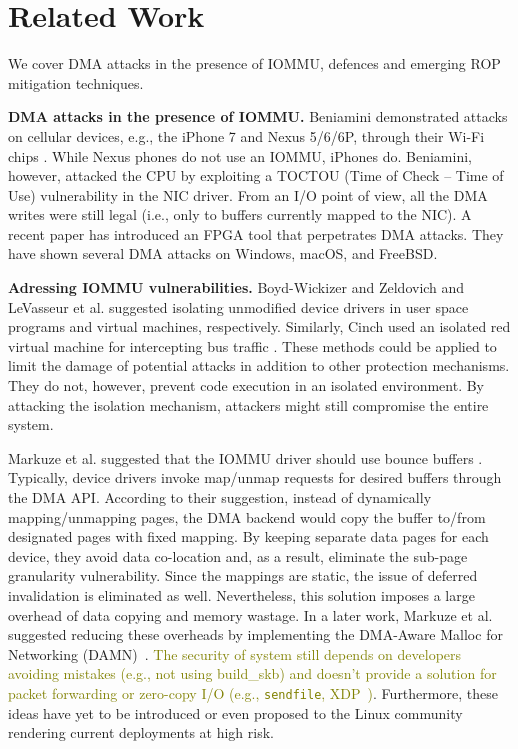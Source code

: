 \section{Related Work}
We cover DMA attacks in the presence of IOMMU, defences and emerging ROP mitigation techniques.

\smallskip
\noindent\textbf{DMA attacks in the presence of IOMMU.}
Beniamini demonstrated attacks on cellular devices, e.g., the iPhone 7 and Nexus 5/6/6P, through their Wi-Fi chips \cite{Ben17a, Ben17b}. While Nexus phones do not use an IOMMU, iPhones do. Beniamini, however, attacked the CPU by exploiting a TOCTOU (Time of Check – Time of Use) vulnerability in the NIC driver. From an I/O point of view, all the DMA writes were still legal (i.e., only to buffers currently mapped to the NIC). A recent paper \cite{thunder} has introduced an FPGA tool that perpetrates DMA attacks. They have shown several \simple DMA attacks on Windows, macOS, and FreeBSD.

\smallskip
\noindent\textbf{Adressing IOMMU vulnerabilities.}
Boyd-Wickizer and Zeldovich \cite{BWZ10} and LeVasseur et al. \cite{LUSG04} suggested isolating unmodified device drivers in user space programs and virtual machines, respectively. Similarly, Cinch used an isolated red virtual machine for intercepting bus traffic \cite{AWH16}. These methods could be applied to limit the damage of potential attacks in addition to other protection mechanisms. They do not, however, prevent code execution in an isolated environment. By attacking the isolation mechanism, attackers might still compromise the entire system.

Markuze et al. suggested that the IOMMU driver should use bounce buffers \cite{MMT16}. Typically, device drivers invoke map/unmap requests for desired buffers through the DMA API. According to their suggestion, instead of dynamically mapping/unmapping pages, the DMA backend would copy the buffer to/from designated pages with fixed mapping. By keeping separate data pages for each device, they avoid data co-location and, as a result, eliminate the sub-page granularity vulnerability. Since the mappings are static, the issue of deferred invalidation is eliminated as well. 
%
Nevertheless, this solution imposes a large overhead of data copying and memory wastage. In a later work, Markuze et al. suggested reducing these overheads by implementing the DMA-Aware Malloc for Networking (DAMN)~\cite{MSMT18}. \textcolor{olive}{The security of system still depends on developers avoiding mistakes (e.g., not using build\_skb) and doesn't provide a solution for packet forwarding or zero-copy I/O (e.g., \texttt{sendfile}, XDP~\cite{xdp})}. Furthermore, these ideas have yet to be introduced or even proposed to the Linux community rendering current deployments at high risk.

